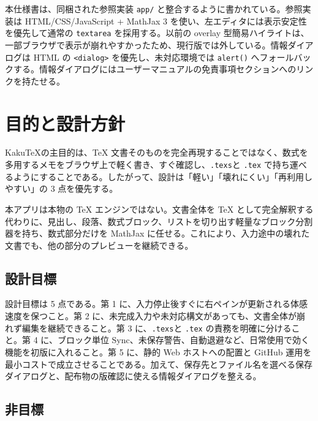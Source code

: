 \documentclass[11pt,a4paper]{ltjsarticle}
\newcommand{\code}[1]{\texttt{#1}}
\newcommand{\appname}{KakuTeX}
\newcommand{\texs}{\code{.texs}}
\begin{document}
\begin{titlepage}
\vfill

\begin{goodbox}[参照実装の位置付け]
本仕様書は、同梱された参照実装 \code{app/} と整合するように書かれている。参照実装は HTML/CSS/JavaScript + MathJax 3 を使い、左エディタには表示安定性を優先して通常の \code{textarea} を採用する。以前の overlay 型簡易ハイライトは、一部ブラウザで表示が崩れやすかったため、現行版では外している。情報ダイアログは HTML の \code{<dialog>} を優先し、未対応環境では \code{alert()} へフォールバックする。情報ダイアログにはユーザーマニュアルの免責事項セクションへのリンクを持たせる。
\end{goodbox}
\end{titlepage}

\tableofcontents
\newpage

\section{目的と設計方針}

\appname の主目的は、TeX 文書そのものを完全再現することではなく、数式を多用するメモをブラウザ上で軽く書き、すぐ確認し、\texs と \code{.tex} で持ち運べるようにすることである。したがって、設計は「軽い」「壊れにくい」「再利用しやすい」の 3 点を優先する。

\begin{decisionbox}[最重要の割り切り]
本アプリは本物の TeX エンジンではない。文書全体を TeX として完全解釈する代わりに、見出し、段落、数式ブロック、リストを切り出す軽量なブロック分割器を持ち、数式部分だけを MathJax に任せる。これにより、入力途中の壊れた文書でも、他の部分のプレビューを継続できる。
\end{decisionbox}

\subsection{設計目標}

設計目標は 5 点である。第 1 に、入力停止後すぐに右ペインが更新される体感速度を保つこと。第 2 に、未完成入力や未対応構文があっても、文書全体が崩れず編集を継続できること。第 3 に、\texs と \code{.tex} の責務を明確に分けること。第 4 に、ブロック単位 Sync、未保存警告、自動退避など、日常使用で効く機能を初版に入れること。第 5 に、静的 Web ホストへの配置と GitHub 運用を最小コストで成立させることである。加えて、保存先とファイル名を選べる保存ダイアログと、配布物の版確認に使える情報ダイアログを整える。

\subsection{非目標}
\end{document}
